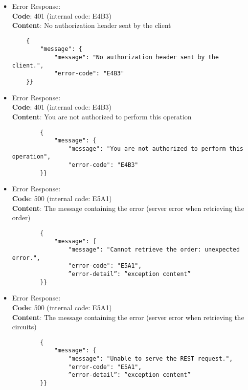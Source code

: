 \begin{itemize}
	\item Error Response:\\
	\textbf{Code}: 401 (internal code: E4B3)\\
	\textbf{Content}: No authorization header sent by the client\\
	\begin{verbatim}
	{
		"message": {
			"message": "No authorization header sent by the client.",
			"error-code": "E4B3"
	}}
	\end{verbatim}	
	\item Error Response:\\
	\textbf{Code}: 401 (internal code: E4B3)\\
	\textbf{Content}: You are not authorized to perform this operation\\
	\begin{verbatim}
		{
			"message": {
				"message": "You are not authorized to perform this operation",
				"error-code": "E4B3"
		}}
	\end{verbatim}	
	\item Error Response:\\
	\textbf{Code}: 500 (internal code: E5A1)\\
	\textbf{Content}: The message containing the error (server error when retrieving the order)\\
	\begin{verbatim}
		{
			"message": {
				"message": "Cannot retrieve the order: unexpected error.",
				"error-code": "E5A1",
				”error-detail”: ”exception content”
		}}
	\end{verbatim}
	\item Error Response:\\
	\textbf{Code}: 500 (internal code: E5A1)\\
	\textbf{Content}: The message containing the error (server error when retrieving the circuits)\\
	\begin{verbatim}
		{
			"message": {
				"message": "Unable to serve the REST request.",
				"error-code": "E5A1",
				”error-detail”: ”exception content”
		}}
	\end{verbatim}
	
\end{itemize}
